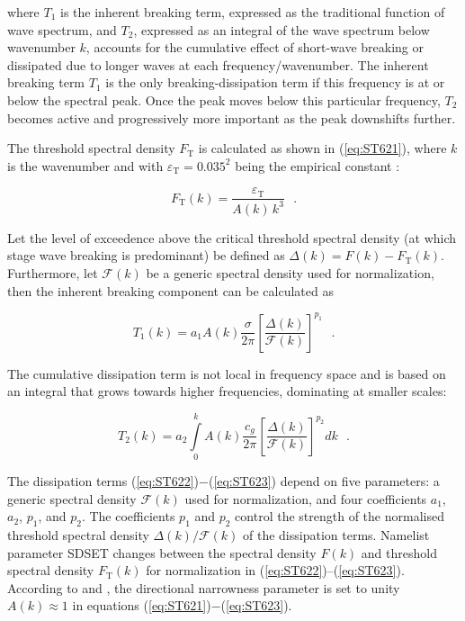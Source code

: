 \noindent
where $T_1$ is the inherent breaking term, expressed as the traditional function
of wave spectrum, and $T_2$, expressed as an integral of the wave spectrum below
wavenumber $k$, accounts for the cumulative effect of short-wave breaking or
dissipated due to longer waves at each frequency/wavenumber. The inherent breaking
term $T_1$ is the only breaking-dissipation term if this frequency is at or below
the spectral peak. Once the peak moves below this particular frequency, $T_2$
becomes active and progressively more important as the peak downshifts further.


The threshold spectral density $F_{\mathrm{T}}$ is calculated as shown in
(\ref{eq:ST621}), where $k$ is the wavenumber and with
$\varepsilon_{\mathrm{T}}=0.035^2$ being the empirical constant
\citep{art:Bea07,bk:Bab11}:

\begin{equation}\label{eq:ST621}
  F_{\mathrm{T}}(k)=\frac{\varepsilon_{\mathrm{T}}}{A(k)\,k^3} \:\:\: . 
\end{equation}

\noindent
Let the level of exceedence above the critical threshold spectral density (at
which stage wave breaking is predominant) be defined as
$\Delta(k)=F(k)-F_{\mathrm{T}}(k)$. Furthermore, let $\mathcal{F}(k)$ be a
generic spectral density used for normalization, then the inherent breaking
component can be calculated as

\begin{equation}\label{eq:ST622}
T_1(k)=a_1 A(k)\frac{\sigma}{2\pi} \left [ \frac{\Delta(k)}{\mathcal{F}(k)}
\right ]^{p_1} \:\:\: .
\end{equation}

\noindent
The cumulative dissipation term is not local in frequency space and is 
based on an integral that grows towards higher frequencies, dominating at 
smaller scales:

\begin{equation}\label{eq:ST623}
T_2(k)=a_2 \int\limits_0^k A(k) \frac{c_g}{2\pi} \left [
\frac{\Delta(k)}{\mathcal{F}(k)} \right ]^{p_2}\!\!dk \:\:\: .
\end{equation}

\noindent
The dissipation terms (\ref{eq:ST622})$-$(\ref{eq:ST623}) depend on five
parameters: a generic spectral density $\mathcal{F}(k)$ used for
normalization, and four coefficients $a_1$, $a_2$, $p_1$, and $p_2$.  The
coefficients $p_1$ and $p_2$ control the strength of the normalised threshold
spectral density $\Delta(k)/\mathcal{F}(k)$ of the dissipation terms.
Namelist parameter {\code SDSET} changes between the spectral density
$F(k)$ and threshold spectral density $F_{\mathrm{T}}(k)$ for
normalization in (\ref{eq:ST622})--(\ref{eq:ST623}).
According to \citet{art:Bea07} and \citet{art:Bab09}, the directional
narrowness parameter is set to unity $A(k)\approx 1$ in equations
(\ref{eq:ST621})$-$(\ref{eq:ST623}).

